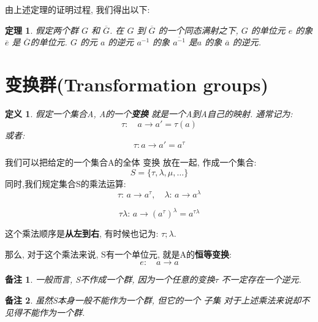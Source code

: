 \documentclass[utf8]{ctexbook}
\newtheorem{theorem}{定理}[section]
\newtheorem{definition}{定义}[section]
\newtheorem{memo}{备注}[section]
\begin{document}
由上述定理的证明过程, 我们得出以下:

\begin{theorem}
假定两个群 $G$ 和 $\overline{G}$. 在 $G$ 到 $\overline{G}$ 的一个同态满射之下, $G$ 的单位元 $e$ 的象 $\overline{e}$ 是 $\overline{G}$的单位元. $G$ 的元 $a$ 的逆元 $a^{-1}$ 的象 $\overline{a^{-1}}$ 是$a$ 的象 $\overline{a}$ 的逆元.

\end{theorem}

\section{变换群(Transformation groups)}

\begin{definition}
假定一个集合A, A的一个\textbf{变换} 就是一个A到A自己的映射. 通常记为:
\begin{equation}
\tau: \quad a \longrightarrow a' = \tau(a)
\end{equation}
或者:
\begin{equation}
\tau: a \longrightarrow a' = a^{\tau}
\end{equation}
\end{definition}

我们可以把给定的一个集合A的全体 变换 放在一起, 作成一个集合:
\begin{equation}
S = \{ \tau, \lambda, \mu, \ldots  \}
\end{equation}
同时,我们规定集合S的乘法运算:
\begin{equation}
\tau: \, a \longrightarrow a^{\tau}, \quad \lambda: \, a \longrightarrow a^{\lambda}
\end{equation}

\begin{equation}
\tau  \lambda : \, a \longrightarrow (a^{\tau})^{\lambda} = a^{\tau \lambda}
\end{equation}

这个乘法顺序是\textbf{从左到右}, 有时候也记为: $\tau ; \lambda $.

那么, 对于这个乘法来说, S有一个单位元, 就是A的\textbf{恒等变换}:
\begin{equation}
e: \quad a \longrightarrow a
\end{equation}

\begin{memo}
一般而言, S不作成一个群, 因为一个任意的变换$\tau$ 不一定存在一个逆元.
\end{memo}

\begin{memo}
虽然S本身一般不能作为一个群, 但它的一个 {\em 子集} 对于上述乘法来说却不见得不能作为一个群.
\end{memo}
\end{document}
